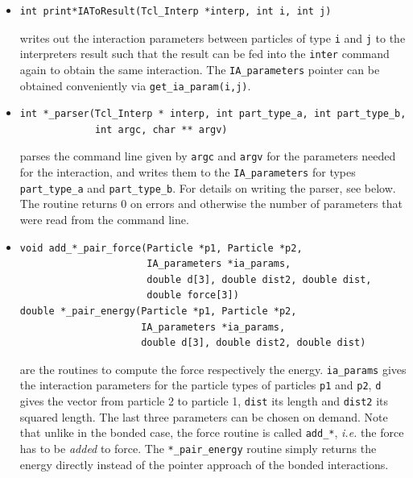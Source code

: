 \documentclass[
a4paper,                        %
11pt,                           %
twoside,                        %
footsepline,                    %
headsepline,                    %
headexclude,                    %
footexclude,                    %
pagesize,                       %
bibtotocnumbered,               %
idxtotoc                        %
]{scrreprt}
\newcommand{\ie}{\textit{i.e.}\xspace}
\begin{document}
\begin{itemize}
\item 
\begin{verbatim}
int print*IAToResult(Tcl_Interp *interp, int i, int j)
\end{verbatim}
  writes out the interaction parameters between particles of type
  \verb!i!  and \verb!j! to the interpreters result such that the
  result can be fed into the \verb!inter! command again to obtain the
  same interaction. The \verb!IA_parameters! pointer can be obtained
  conveniently via \verb!get_ia_param(i,j)!.
\item 
\begin{verbatim}
int *_parser(Tcl_Interp * interp, int part_type_a, int part_type_b, 
             int argc, char ** argv)
\end{verbatim}
  parses the command line given by \verb!argc! and \verb!argv! for the
  parameters needed for the interaction, and writes them to the
  \verb!IA_parameters! for types \verb!part_type_a! and
  \verb!part_type_b!. For details on writing the parser, see
  below. The routine returns 0 on errors and otherwise the number of
  parameters that were read from the command line.
\item 
\begin{verbatim}
void add_*_pair_force(Particle *p1, Particle *p2, 
                      IA_parameters *ia_params, 
                      double d[3], double dist2, double dist, 
                      double force[3])
double *_pair_energy(Particle *p1, Particle *p2, 
                     IA_parameters *ia_params, 
                     double d[3], double dist2, double dist)
\end{verbatim}
  are the routines to compute the force respectively the
  energy. \verb!ia_params! gives the interaction parameters for the
  particle types of particles \verb!p1! and \verb!p2!, \verb!d! gives
  the vector from particle 2 to particle 1, \verb!dist! its length and
  \verb!dist2!  its squared length. The last three parameters can be
  chosen on demand. Note that unlike in the bonded case, the force
  routine is called \verb!add_*!, \ie the force has to be \emph{added}
  to force. The \verb!*_pair_energy! routine simply returns the energy
  directly instead of the pointer approach of the bonded
  interactions.
\end{itemize}
\end{document}
